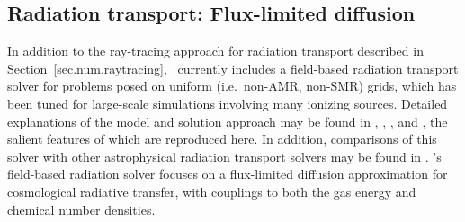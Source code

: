\subsection{Radiation transport: Flux-limited diffusion}
\label{sec.num.rad-fld}


In addition to the ray-tracing approach for radiation transport
described in Section~\ref{sec.num.raytracing}, \enzo\ currently includes
a field-based radiation transport solver for problems posed on uniform
(i.e.~non-AMR, non-SMR) grids, which has been tuned for large-scale simulations
involving many ionizing sources.  Detailed explanations of the model and
solution approach may be found in
\citet{NBHBROW2007}, \citet{ReynoldsHayesPaschosNorman2009},
\citet{NRS2009}, and \citet{2013arXiv1306.0645N}, the salient features of which are reproduced here. 
In addition, comparisons of this solver with other astrophysical
radiation transport solvers may be found in \cite{IlievEtAl2009}.  
\enzo's field-based radiation solver focuses on
a flux-limited diffusion approximation for cosmological radiative
transfer, with couplings to both the gas energy and chemical number
densities.
